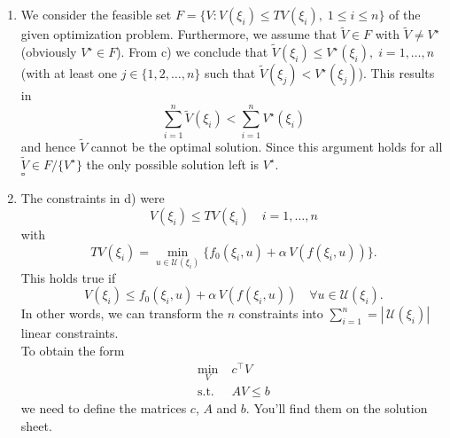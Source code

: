 \documentclass[12pt,pdftex,a4paper]{scrartcl}
\begin{document}
\begin{enumerate}
	\item We consider the feasible set $F = \{V : V(\xi_i) \le TV(\xi_i), \; 1\le i \le n\}$ of the given optimization problem. Furthermore, we assume that $\tilde{V}\in F$ with $\tilde{V} \neq V^\star$ (obviously $V^\star \in F$). From c) we conclude that $\tilde{V}(\xi_i) \le V^\star(\xi_i), \; i = 1,\ldots, n$ (with at least one $j\in\{1,2,\ldots ,n\}$ such that $\tilde{V}(\xi_j) < V^\star(\xi_j)$). This results in
	\begin{equation*}
		\sum_{i=1}^n \tilde{V}(\xi_i) < \sum_{i=1}^n V^\star(\xi_i)
	\end{equation*}
	and hence $\tilde{V}$ cannot be the optimal solution. Since this argument holds for all $\tilde{V} \in F/\{V^\star\}$ the only possible solution left is $V^\star$.\\
	\hspace*{133mm}$\square$
	
	\item The constraints in d) were
	\begin{equation*}
		V(\xi_i) \le TV(\xi_i) \quad i = 1,\ldots, n
	\end{equation*}
	with
	\begin{equation*}
		TV(\xi_i) = \min_{u\in\mathcal{U}(\xi_i)}\{ f_0(\xi_i,u) + \alpha\,V(f(\xi_i,u))\}.
	\end{equation*}
	This holds true if
	\begin{equation*}
		V(\xi_i) \le  f_0(\xi_i,u) + \alpha\,V(f(\xi_i,u))\quad \forall u\in\mathcal{U}(\xi_i).
	\end{equation*}
	In other words, we can transform the $n$ constraints into $\sum_{i=1}^n = |\,\mathcal{U}(\xi_i)|$ linear constraints.\\
	To obtain the form
	\begin{equation*}
		\begin{split}
			\min_V \;& c^\top V\\
			\text{s.t.} \;& AV \le b
		\end{split}
	\end{equation*}
	we need to define the matrices $c$, $A$ and $b$. You'll find them on the solution sheet.
	

\end{enumerate}
\end{document}
